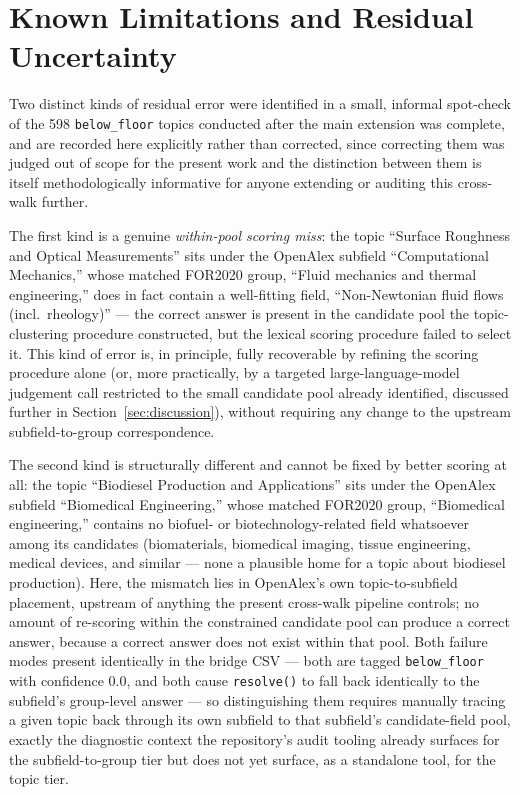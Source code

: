 \documentclass[11pt]{article}
\begin{document}
\section{Known Limitations and Residual Uncertainty}
\label{sec:limitations}

Two distinct kinds of residual error were identified in a small, informal spot-check of
the 598 \texttt{below\_floor} topics conducted after the main extension was complete,
and are recorded here explicitly rather than corrected, since correcting them was judged
out of scope for the present work and the distinction between them is itself
methodologically informative for anyone extending or auditing this cross-walk further.

The first kind is a genuine \emph{within-pool scoring miss}: the topic ``Surface
Roughness and Optical Measurements'' sits under the OpenAlex subfield ``Computational
Mechanics,'' whose matched FOR2020 group, ``Fluid mechanics and thermal engineering,''
does in fact contain a well-fitting field, ``Non-Newtonian fluid flows (incl.\
rheology)'' --- the correct answer is present in the candidate pool the topic-clustering
procedure constructed, but the lexical scoring procedure failed to select it. This kind
of error is, in principle, fully recoverable by refining the scoring procedure alone
(or, more practically, by a targeted large-language-model judgement call restricted to
the small candidate pool already identified, discussed further in
Section~\ref{sec:discussion}), without requiring any change to the upstream
subfield-to-group correspondence.

The second kind is structurally different and cannot be fixed by better scoring at all:
the topic ``Biodiesel Production and Applications'' sits under the OpenAlex subfield
``Biomedical Engineering,'' whose matched FOR2020 group, ``Biomedical engineering,''
contains no biofuel- or biotechnology-related field whatsoever among its candidates
(biomaterials, biomedical imaging, tissue engineering, medical devices, and similar ---
none a plausible home for a topic about biodiesel production). Here, the mismatch lies
in OpenAlex's own topic-to-subfield placement, upstream of anything the present
cross-walk pipeline controls; no amount of re-scoring within the constrained candidate
pool can produce a correct answer, because a correct answer does not exist within that
pool. Both failure modes present identically in the bridge CSV --- both are tagged
\texttt{below\_floor} with confidence 0.0, and both cause \texttt{resolve()} to fall back
identically to the subfield's group-level answer --- so distinguishing them requires
manually tracing a given topic back through its own subfield to that subfield's
candidate-field pool, exactly the diagnostic context the repository's audit tooling
already surfaces for the subfield-to-group tier but does not yet surface, as a
standalone tool, for the topic tier.
\end{document}
